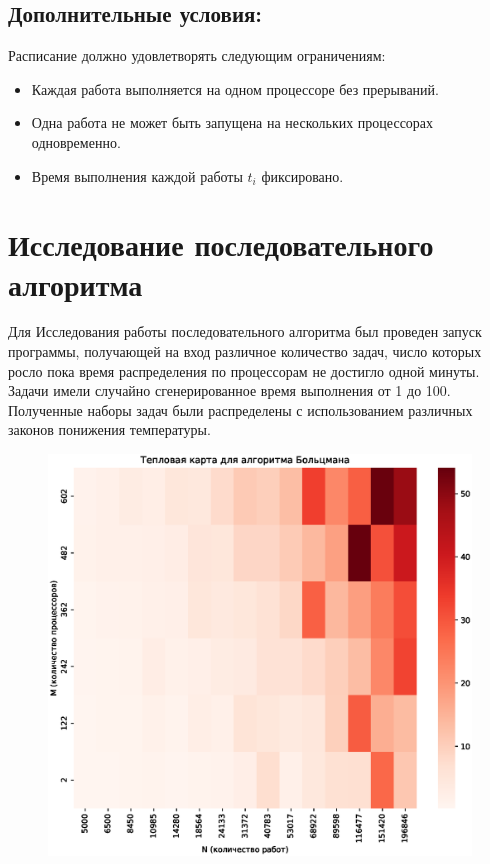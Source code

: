 \documentclass[openany, twoside, a4paper, 12pt]{extbook}
\begin{document}
	\subsection*{Дополнительные условия:}
	
	Расписание должно удовлетворять следующим ограничениям:
	\begin{itemize}
	    \item Каждая работа выполняется на одном процессоре без прерываний.
	    \item Одна работа не может быть запущена на нескольких процессорах одновременно.
	    \item Время выполнения каждой работы \( t_i \) фиксировано.
	\end{itemize}
	\section*{Исследование последовательного алгоритма}
	Для Исследования работы последовательного алгоритма
	был проведен запуск программы, получающей на вход 
	различное количество задач, число которых росло пока время распределения по процессорам
	не достигло одной минуты.
	Задачи имели случайно сгенерированное время выполнения от 1 до 100.
	Полученные наборы задач были распределены с использованием различных законов понижения температуры.

	\begin{figure}[h]
	    \centering
	    \includegraphics[width=\textwidth]{boltzmann_heatmap.eps}
	    \label{fig:boltzmann}
	\end{figure}
	
\end{document}
